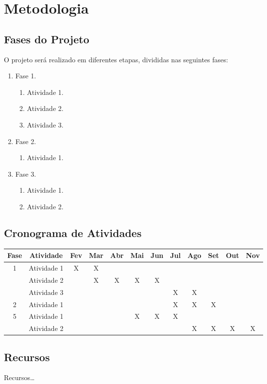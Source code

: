 \section{Metodologia}\label{metodologia}

\subsection{Fases do Projeto}

O projeto será realizado em diferentes etapas, divididas nas seguintes fases:
\begin{enumerate}

\item Fase 1.
	\begin{enumerate}
	\item Atividade 1.
	\item Atividade 2.
	\item Atividade 3.
	\end{enumerate}
	
\item Fase 2.
	\begin{enumerate}
	\item Atividade 1.
	\end{enumerate}
	
\item Fase 3.
	\begin{enumerate}
	\item Atividade 1.
	\item Atividade 2.
	\end{enumerate}
\end{enumerate}

\subsection{Cronograma de Atividades}

\begin{table}[H]
	\centering
   	\newcommand{\row}{\multirow}
	\begin{tabulary}{\textwidth}{|C|C|C|C|C|C|C|C|C|C|C|C|} \hline
	Fase			& Atividade		& Fev & Mar & Abr & Mai & Jun & Jul & Ago & Set & Out & Nov \\ \hline
	\row{3}{*}{1}	& Atividade 1	&  X  &  X  &     &     &     &     &     &     &     &     \\ 
					& Atividade 2	&     &  X  &  X  &  X  &  X  &     &     &     &     &     \\ 
					& Atividade 3 	&     &     &     &     &     &  X  &  X  &     &     &     \\ 				& Atividade 1	&     &     &     &     &     &  X  &  X  &  X  &     &     \\ \hline
	\row{2}{*}{5}	& Atividade 1	&     &     &     &  X  &  X  &  X  &     &     &     &     \\ 
					& Atividade 2	&     &     &     &     &     &     &  X  &  X  &  X  &  X  \\ \hline
	\end{tabulary}
\end{table}

\subsection{Recursos}

Recursos\ldots